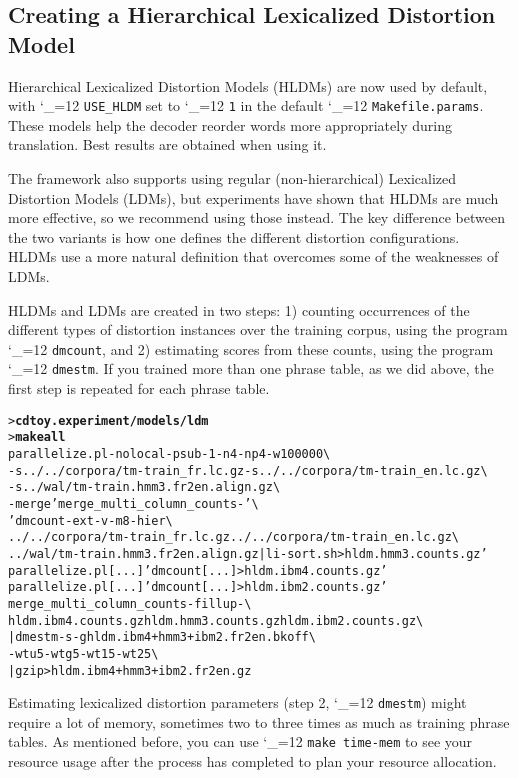 \documentclass[11pt,letterpaper]{article}
\newcommand{\bs}{\textbackslash{}}
\def\code{\begingroup\catcode`\_=12 \codex}
\newcommand{\codex}[1]{\texttt{#1}\endgroup}
\begin{document}
\subsection{Creating a Hierarchical Lexicalized Distortion Model} \label{LDM}

Hierarchical Lexicalized Distortion Models (HLDMs) are now used by default,
with \code{USE_HLDM} set to \code{1} in the default \code{Makefile.params}.
These models help the decoder reorder words more appropriately during
translation. Best results are obtained when using it.

The framework also supports using regular (non-hierarchical) Lexicalized
Distortion Models (LDMs), but experiments have shown that HLDMs are much
more effective, so we recommend using those instead.  The key difference between
the two variants is how one defines the different distortion configurations.
HLDMs use a more natural definition that overcomes some of the weaknesses of
LDMs.

HLDMs and LDMs are created in two steps: 1) counting occurrences of the
different types of distortion instances over the training corpus, using the
program \code{dmcount}, and 2) estimating scores from these counts, using the
program \code{dmestm}.  If you trained more than one phrase table, as we did
above, the first step is repeated for each phrase table.
\begin{small}
\begin{alltt}
   > \textbf{cd toy.experiment/models/ldm}
   > \textbf{make all}
   parallelize.pl -nolocal -psub -1 -n 4 -np 4 -w 100000 \bs
      -s ../../corpora/tm-train_fr.lc.gz -s ../../corpora/tm-train_en.lc.gz \bs
      -s ../wal/tm-train.hmm3.fr2en.align.gz \bs
      -merge 'merge_multi_column_counts -' \bs
      'dmcount -ext -v -m 8 -hier \bs
         ../../corpora/tm-train_fr.lc.gz ../../corpora/tm-train_en.lc.gz \bs
         ../wal/tm-train.hmm3.fr2en.align.gz | li-sort.sh > hldm.hmm3.counts.gz'
   parallelize.pl [...] 'dmcount [...] > hldm.ibm4.counts.gz'
   parallelize.pl [...] 'dmcount [...] > hldm.ibm2.counts.gz'
   merge_multi_column_counts -fillup - \bs
      hldm.ibm4.counts.gz hldm.hmm3.counts.gz hldm.ibm2.counts.gz \bs
      | dmestm -s -g hldm.ibm4+hmm3+ibm2.fr2en.bkoff \bs
        -wtu 5 -wtg 5 -wt1 5 -wt2 5 \bs
      | gzip > hldm.ibm4+hmm3+ibm2.fr2en.gz
\end{alltt}
\end{small}

Estimating lexicalized distortion parameters (step 2, \code{dmestm}) might
require a lot of memory, sometimes two to three times as much as training
phrase tables.  As mentioned before, you can use \code{make time-mem} to see
your resource usage after the process has completed to plan your resource
allocation.
\end{document}

